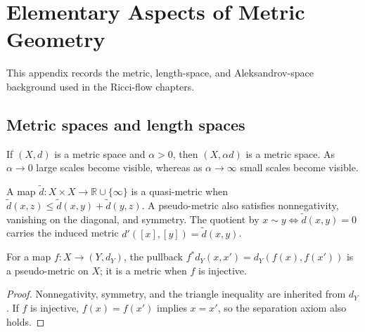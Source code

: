 \chapter{Elementary Aspects of Metric Geometry}
\label{app:chow-iii-elementary-metric-geometry}

\newcommand{\GH}{d_{\mathrm{GH}}}
\newcommand{\GHpt}{d^{\mathrm{pt}}_{\mathrm{GH}}}
\newcommand{\diam}{\operatorname{diam}}
\newcommand{\Cone}{\operatorname{Cone}}
\newcommand{\cL}{\mathcal L}
\newcommand{\cA}{\mathcal A}
\newcommand{\R}{\mathbb R}
\newcommand{\dH}{d_{\mathrm H}}
\newcommand{\dimH}{\operatorname{dim}_{\mathrm H}}

This appendix records the metric, length-space, and Aleksandrov-space
background used in the Ricci-flow chapters.

\section{Metric spaces and length spaces}

\begin{remark}
\label{rem:chow-iii-g1-scaling-metric-spaces}
If $(X,d)$ is a metric space and $\alpha>0$, then $(X,\alpha d)$ is a metric
space.  As $\alpha\to0$ large scales become visible, whereas as
$\alpha\to\infty$ small scales become visible.
\end{remark}

\begin{remark}
\label{rem:chow-iii-g2-quasi-metric}
A map $\widetilde d:X\times X\to\R\cup\{\infty\}$ is a quasi-metric when
$\widetilde d(x,z)\leq\widetilde d(x,y)+\widetilde d(y,z)$.  A pseudo-metric
also satisfies nonnegativity, vanishing on the diagonal, and symmetry.  The
quotient by $x\sim y\iff\widetilde d(x,y)=0$ carries the induced metric
$d'([x],[y])=\widetilde d(x,y)$.
\end{remark}

\begin{proposition}
\label{prop:chow-iii-g3-pullback-metric}
For a map $f:X\to(Y,d_Y)$, the pullback $f^*d_Y(x,x')=d_Y(f(x),f(x'))$
is a pseudo-metric on $X$; it is a metric when $f$ is injective.
\end{proposition}
\begin{proof}
\sketch
Nonnegativity, symmetry, and the triangle inequality are inherited from
$d_Y$.  If $f$ is injective, $f(x)=f(x')$ implies $x=x'$, so the separation
axiom also holds.
\end{proof}

